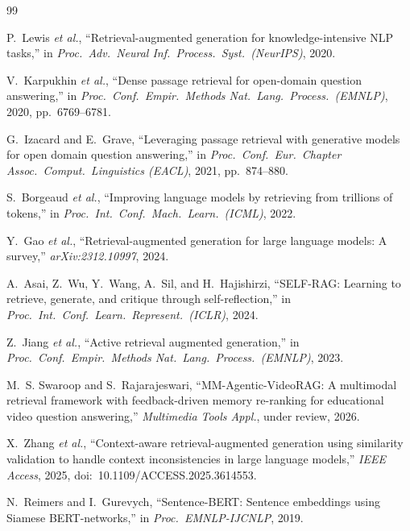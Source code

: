 \documentclass[journal]{IEEEtran}
\begin{document}
\begin{thebibliography}{99}

P.~Lewis \emph{et al.},
``Retrieval-augmented generation for knowledge-intensive NLP tasks,''
in \emph{Proc.\ Adv.\ Neural Inf.\ Process.\ Syst.\ (NeurIPS)},
2020.

V.~Karpukhin \emph{et al.},
``Dense passage retrieval for open-domain question answering,''
in \emph{Proc.\ Conf.\ Empir.\ Methods Nat.\ Lang.\ Process.\ (EMNLP)},
2020, pp.~6769--6781.

G.~Izacard and E.~Grave,
``Leveraging passage retrieval with generative models for open domain
question answering,''
in \emph{Proc.\ Conf.\ Eur.\ Chapter Assoc.\ Comput.\ Linguistics
(EACL)},
2021, pp.~874--880.

S.~Borgeaud \emph{et al.},
``Improving language models by retrieving from trillions of tokens,''
in \emph{Proc.\ Int.\ Conf.\ Mach.\ Learn.\ (ICML)}, 2022.

Y.~Gao \emph{et al.},
``Retrieval-augmented generation for large language models: A survey,''
\emph{arXiv:2312.10997}, 2024.

A.~Asai, Z.~Wu, Y.~Wang, A.~Sil, and H.~Hajishirzi,
``SELF-RAG: Learning to retrieve, generate, and critique through
self-reflection,''
in \emph{Proc.\ Int.\ Conf.\ Learn.\ Represent.\ (ICLR)}, 2024.

Z.~Jiang \emph{et al.},
``Active retrieval augmented generation,''
in \emph{Proc.\ Conf.\ Empir.\ Methods Nat.\ Lang.\ Process.\ (EMNLP)},
2023.

M.~S. Swaroop and S.~Rajarajeswari,
``MM-Agentic-VideoRAG: A multimodal retrieval framework with
feedback-driven memory re-ranking for educational video question
answering,''
\emph{Multimedia Tools Appl.}, under review, 2026.

X.~Zhang \emph{et al.},
``Context-aware retrieval-augmented generation using similarity
validation to handle context inconsistencies in large language models,''
\emph{IEEE Access}, 2025, doi:~10.1109/ACCESS.2025.3614553.

N.~Reimers and I.~Gurevych,
``Sentence-BERT: Sentence embeddings using Siamese BERT-networks,''
in \emph{Proc.\ EMNLP-IJCNLP}, 2019.


\end{thebibliography}
\end{document}
